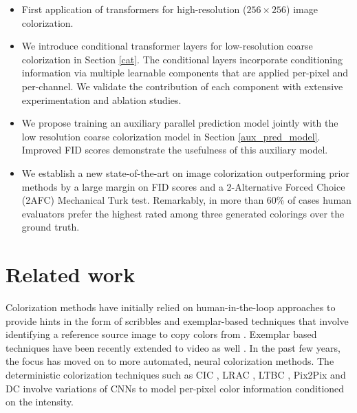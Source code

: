 \documentclass{article} \usepackage{iclr2021_conference,times}
\begin{document}
\begin{itemize}
    \item First application of transformers for high-resolution ($256 \times 256$) image colorization.
    \item We introduce conditional transformer layers for low-resolution coarse colorization in Section \ref{cat}. The conditional layers incorporate conditioning information via multiple learnable components that are applied per-pixel and per-channel. We validate the contribution of each component with extensive experimentation and ablation studies.
    \item We propose training an auxiliary parallel prediction model jointly with the low resolution coarse colorization model in Section \ref{aux_pred_model}. Improved FID scores demonstrate the usefulness of this auxiliary model.
    \item We establish a new state-of-the-art on image colorization outperforming prior methods by a large margin on FID scores and a 2-Alternative Forced Choice (2AFC) Mechanical Turk test. Remarkably, in  more than 60\% of cases human evaluators prefer the highest rated among three generated colorings over the ground truth.
\end{itemize}


\section{Related work}
\label{related_work}
Colorization methods have initially relied on human-in-the-loop approaches to provide hints in the form of scribbles \citep{levin2004colorization, ironi2005colorization, huang2005adaptive, yatziv2006fast, qu2006manga, luan2007natural, tsaftaris2014novel, zhang2017real, ci2018user} and exemplar-based techniques that involve identifying a reference source image to copy colors from \citep{reinhard2001color, welsh2002transferring, tai2005local, ironi2005colorization, pitie2007automated, morimoto2009automatic, gupta2012image, xiao2020example}. Exemplar based techniques have been recently extended to video as well \citep{zhang2019deep}. In the past few years, the focus has  moved on to more automated, neural colorization methods. 
The deterministic colorization techniques such as CIC \citep{zhang2016colorful}, LRAC \citep{larsson2016learning}, LTBC \citep{iizuka2016let}, Pix2Pix \citep{isola2017image} and DC \citep{cheng2015deep, dahl2016automatic} involve variations of CNNs to model per-pixel color information conditioned on the intensity. 
\end{document}
